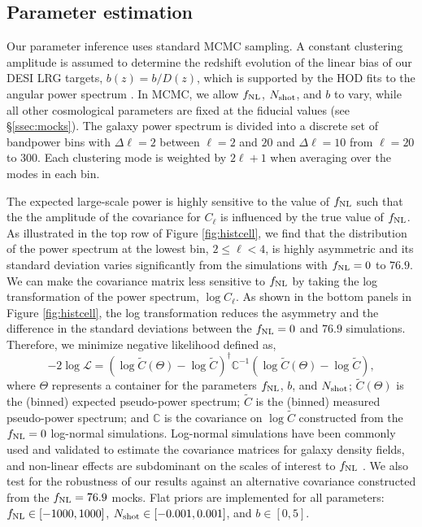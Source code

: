 \subsection{Parameter estimation}

Our parameter inference uses standard MCMC sampling. A constant clustering amplitude is assumed to determine the redshift evolution of the linear bias of our DESI LRG targets, $b(z) = b/D(z)$, which is supported by the HOD fits to the angular power spectrum \citep{zhou2021clustering}. In MCMC, we allow $f_{\rm NL}$, $N_{\rm shot}$, and $b$ to vary, while all other cosmological parameters are fixed at the fiducial values (see \S \ref{ssec:mocks}). The galaxy power spectrum is divided into a discrete set of bandpower bins with $\Delta\ell=2$ between $\ell=2$ and $20$ and $\Delta \ell=10$ from $\ell=20$ to $300$. Each clustering mode is weighted by $2\ell+1$ when averaging over the modes in each bin.

The expected large-scale power is highly sensitive to the value of $f_{\rm NL}$ such that the the amplitude of the covariance for $C_{\ell}$ is influenced by the true value of $f_{\rm NL}$. As illustrated in the top row of Figure \ref{fig:histcell}, we find that the distribution of the power spectrum at the lowest bin, $2\leq \ell < 4$, is highly asymmetric and its standard deviation varies significantly from the simulations with $f_{\rm NL}=0$ to $76.9$. We can make the covariance matrix less sensitive to $f_{\rm NL}$ by taking the log transformation of the power spectrum, $\log C_{\ell}$. As shown in the bottom panels in Figure \ref{fig:histcell}, the log transformation reduces the asymmetry and the difference in the standard deviations between the $f_{\rm NL}=0$ and $76.9$ simulations. Therefore, we minimize  negative  likelihood defined as,
\begin{equation}\label{eq:likelihood}
-2\log \mathcal{L} = (\log \tilde{C}(\Theta)-\log \tilde{C})^{\dagger} \mathbb{C}^{-1} (\log \tilde{C}(\Theta)-\log \tilde{C}),
\end{equation}
where $\Theta$ represents a container for the parameters $f_{\rm NL}$, $b$, and $N_{\rm shot}$; $\tilde{C}(\Theta)$ is the (binned) expected pseudo-power spectrum; $\tilde{C}$ is the (binned) measured pseudo-power spectrum; and $\mathbb{C}$ is the covariance on $\log\tilde{C}$ constructed from the $f_{\rm NL}=0$ log-normal simulations. Log-normal simulations have been commonly used and validated to estimate the covariance matrices for galaxy density fields, and non-linear effects are subdominant on the scales of interest to $f_{\rm NL}$ \citep[see, e.g.,][]{2017MNRAS.466.1444C, 2021MNRAS.508.3125F}. We also test for the robustness of our results against an alternative covariance constructed from the $f_{\rm NL}=76.9$ mocks. Flat priors are implemented for all parameters: $f_{\rm NL} \in [-1000, 1000]$, $N_{\rm shot} \in [-0.001, 0.001]$, and $b \in [0, 5]$.


